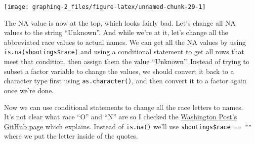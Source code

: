 \documentclass[
  12pt,
]{book}
\newenvironment{Shaded}{\begin{snugshade}}{\end{snugshade}}
\newcommand{\KeywordTok}[1]{\textcolor[rgb]{0.13,0.29,0.53}{\textbf{#1}}}
\newcommand{\NormalTok}[1]{#1}
\newcommand{\OperatorTok}[1]{\textcolor[rgb]{0.81,0.36,0.00}{\textbf{#1}}}
\newcommand{\StringTok}[1]{\textcolor[rgb]{0.31,0.60,0.02}{#1}}
\begin{document}
\begin{center}\texttt{[image: graphing-2\_files/figure-latex/unnamed-chunk-29-1]} \end{center}

The NA value is now at the top, which looks fairly bad. Let's change all NA values to the string ``Unknown''. And while we're at it, let's change all the abbreviated race values to actual names. We can get all the NA values by using \texttt{is.na(shootings\$race)} and using a conditional statement to get all rows that meet that condition, then assign them the value ``Unknown''. Instead of trying to subset a factor variable to change the values, we should convert it back to a character type first using \texttt{as.character()}, and then convert it to a factor again once we're done.

\begin{Shaded}
\end{Shaded}

Now we can use conditional statements to change all the race letters to names. It's not clear what race ``O'' and ``N'' are so I checked the \href{https://github.com/washingtonpost/data-police-shootings}{Washington Post's GitHub page} which explains. Instead of \texttt{is.na()} we'll use \texttt{shootings\$race\ ==\ ""} where we put the letter inside of the quotes.

\begin{Shaded}
\end{Shaded}
\end{document}
